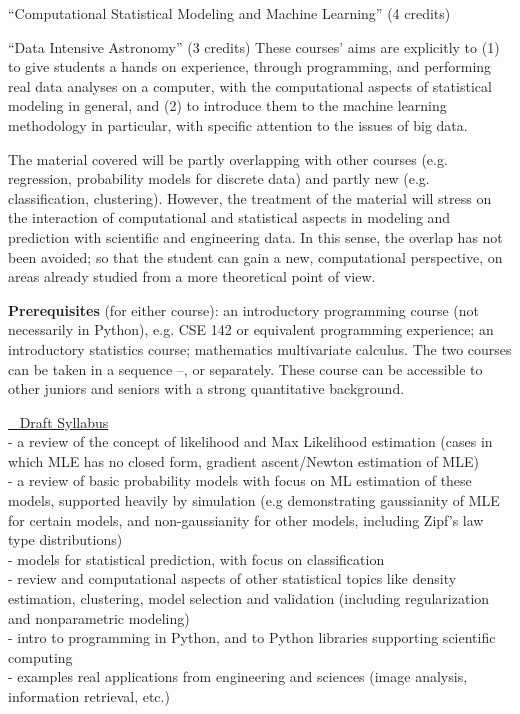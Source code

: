\bits
\item \statcl 
``Computational Statistical Modeling and Machine Learning'' (4 credits)
\item \astrocl ``Data Intensive Astronomy'' (3 credits)
\eits
These courses' aims are explicitly to (1) to give students a hands on experience, through programming, and performing real data analyses on a computer, with the computational aspects of 
statistical modeling in general, and (2) to introduce them to the  machine learning methodology in particular, with specific attention to the issues of big data.

The material covered will be partly overlapping with other courses
(e.g. regression, probability models for discrete data) and partly new
(e.g. classification, clustering). However, the treatment of the
material will stress on the interaction of computational and
statistical aspects in modeling and prediction with scientific and
engineering data. In this sense, the overlap has not been avoided; so that
the student can gain a new, computational perspective, on areas
already studied from a more theoretical point of view. 

{\bf Prerequisites} (for either course): an introductory programming
course (not necessarily in Python), e.g. CSE 142 or equivalent
programming experience; an introductory statistics course; mathematics
multivariate calculus. The two courses can be taken in a sequence
\statcl--\astrocl, or separately. These course can be accessible to
other juniors and seniors with a strong quantitative background.

\bit
\item  \underline{\statcl~ Draft Syllabus}\\
  - a review of the concept of likelihood and Max Likelihood estimation (cases in which MLE has no closed form, gradient ascent/Newton estimation of MLE)\\
  - a review of basic probability models with focus on ML estimation of these models, supported heavily by simulation (e.g demonstrating gaussianity of MLE for certain models, and non-gaussianity for other models, including Zipf's law type distributions)\\
  - models for statistical prediction, with focus on classification\\
  - review and computational aspects of other statistical topics like
  density estimation, clustering, model selection and validation
  (including regularization and  nonparametric modeling)\\
  - intro to programming in Python, and to Python libraries supporting scientific computing\\
  - examples real applications from engineering and sciences (image
  analysis, information retrieval, etc.)

